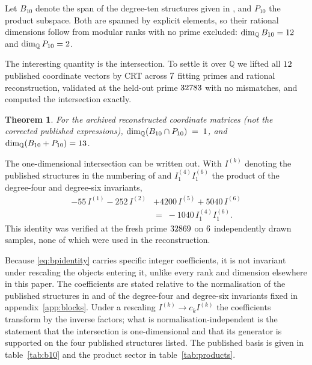 \documentclass[11pt,a4paper]{article}
\newtheorem{theorem}{Theorem}
\theoremstyle{definition}
\theoremstyle{remark}
\newcommand{\Bten}{B_{10}}
\newcommand{\Pten}{P_{10}}
\newcommand{\Q}{\mathbb{Q}}
\begin{document}
Let $\Bten$ denote the span of the degree-ten structures given in
\cite{Cederwall:2025invariants}, and $\Pten$ the product subspace. Both are
spanned by explicit elements, so their rational dimensions follow from modular
ranks with no prime excluded:
$\dim_\Q \Bten = \dimBten$ and $\dim_\Q \Pten = \dimPten$.

The interesting quantity is the intersection. To settle it over $\Q$ we lifted
all $12$ published coordinate vectors by CRT across $7$ fitting
primes and rational reconstruction, validated at the held-out prime
$32783$ with no mismatches, and computed the intersection exactly.

\begin{theorem}
\label{thm:bp}
For the archived reconstructed coordinate matrices (not the corrected
published expressions),
$\dim_\Q(\Bten \cap \Pten) \;\bpCapRelation\; \dimBcapP$, and
$\dim_\Q(\Bten + \Pten) = \dimBplusP$.
\end{theorem}

The one-dimensional intersection can be written out. With $I^{(k)}$ denoting the
published structures in the numbering of \cite{Cederwall:2025invariants} and
$I^{(4)}_1 I^{(6)}_1$ the product of the degree-four and degree-six invariants,
\begin{equation}
\begin{split}
-55\,I^{(1)} - 252\,I^{(2)}& + 4200\,I^{(5)} + 5040\,I^{(6)} \\
 &=\; -1040\,I^{(4)}_1 I^{(6)}_1 .
\end{split}
\label{eq:bpidentity}
\end{equation}
This identity was verified at the fresh prime $32869$ on
$6$ independently drawn samples, none of which were used in the
reconstruction.

Because \eqref{eq:bpidentity} carries specific integer coefficients, it is not
invariant under rescaling the objects entering it, unlike every rank and
dimension elsewhere in this paper. The coefficients are stated relative to the
normalisation of the published structures in \cite{Cederwall:2025invariants} and
of the degree-four and degree-six invariants fixed in
appendix~\ref{app:blocks}. Under a rescaling $I^{(k)} \to c_k I^{(k)}$ the
coefficients transform by the inverse factors; what is normalisation-independent
is the statement that the intersection is one-dimensional and that its generator
is supported on the four published structures listed. The published basis is
given in table~\ref{tab:b10} and the product sector in
table~\ref{tab:products}.
\end{document}
